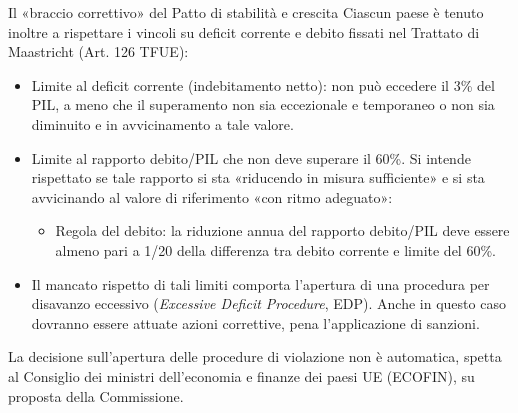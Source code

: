 \documentclass[aspectratio=149,11pt,italian]{beamer}
\begin{document}
\begin{frame}{Il «braccio correttivo» del Patto di stabilità e crescita}
Ciascun paese è tenuto inoltre a rispettare i vincoli su deficit corrente e debito fissati nel Trattato di Maastricht (Art. 126 TFUE):
\begin{itemize}
\item \alert{Limite al deficit corrente} (indebitamento netto): non può eccedere il 3\%
del PIL, a meno che il superamento non sia eccezionale e temporaneo o non sia
diminuito e in avvicinamento a tale valore.
\item \alert{Limite al rapporto debito/PIL} che non deve superare il 60\%. Si intende
rispettato se tale rapporto si sta «riducendo in misura sufficiente» e si sta
avvicinando al valore di riferimento «con ritmo adeguato»:
\begin{itemize}
\item \alert{Regola del debito}: la riduzione annua del rapporto
debito/PIL deve essere almeno pari a 1/20 della differenza tra debito
corrente e limite del 60\%.
\end{itemize}
\item Il mancato rispetto di tali limiti comporta l'apertura di una \alert{procedura per
disavanzo eccessivo} (\emph{Excessive Deficit Procedure}, EDP). Anche in questo
caso dovranno essere attuate azioni correttive, pena l'applicazione di
sanzioni.
\end{itemize}
\begin{block}{}
\small
La decisione sull'apertura delle procedure di violazione non è automatica,
spetta al Consiglio dei ministri dell'economia e finanze dei paesi UE
(ECOFIN), su proposta della Commissione.
\end{block}
\end{frame}
\end{document}

